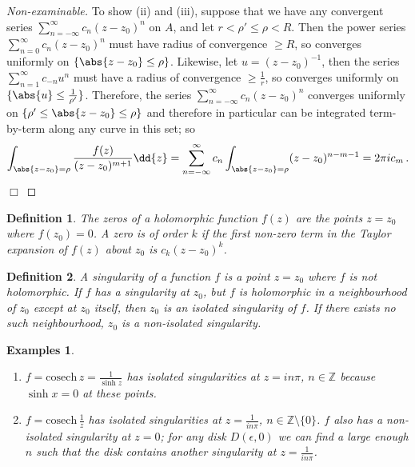 \documentclass{article}
\theoremstyle{plain}\theoremheaderfont{\normalfont\itshape}\theorembodyfont{\rmfamily}\theoremseparator{.}\newtheorem*{rem}{Remark}\newtheorem*{ex}{Example}\newtheorem*{proof}{Proof}\newtheorem*{altp}{Alternative proof}
\theoremstyle{plain}\theoremheaderfont{\normalfont\bfseries}\theorembodyfont{\rmfamily}\theoremseparator{.}\newtheorem{thm}{Theorem}[section]\newtheorem{lem}[thm]{Lemma}\newtheorem{prop}[thm]{Proposition}\newtheorem*{cor}{Corollary}\newtheorem{defn}[thm]{Definition}\newtheorem{clm}[thm]{Claim}\newtheorem{clminproof}{Claim}
\theoremstyle{break}\theoremheaderfont{\normalfont\itshape}\theorembodyfont{\rmfamily}\theoremseparator{.\medskip}\newtheorem*{proofskip}{Proof}\newtheorem*{exs}{Examples}\newtheorem*{rems}{Remarks}
\theoremstyle{break}\theoremheaderfont{\normalfont\bfseries}\theorembodyfont{\rmfamily}\theoremseparator{.\medskip}\newtheorem{lemskip}[thm]{Lemma}\newtheorem{defnskip}[thm]{Definition}\newtheorem{propskip}[thm]{Proposition}\newtheorem{thmskip}[thm]{Theorem}
\numberwithin{equation}{section}
\newcommand{\qed}{\hfill\ensuremath{\Box}}
\begin{document}
\begin{proof}[Non-examinable]
		To show (ii) and (iii), suppose that we have any convergent series \(\sum_{n=-\infty}^{\infty} c_n(z-z_0)^n\) on \(A\),  and let \(r<\rho'\le\rho<R\). Then the power series \(\sum_{n=0}^{\infty}c_n(z-z_0)^n\) must have radius of convergence \(\ge R\), so converges uniformly on \(\{\abs{z-z_0}\le\rho\}\). Likewise, let \(u=(z-z_0)^{-1}\), then the series \(\sum_{n=1}^{\infty}c_{-n}u^n\) must have a radius of convergence \(\ge\frac{1}{r}\), so converges uniformly on \(\{\abs{u}\le\frac{1}{\rho'}\}\). Therefore, the series \(\sum_{n=-\infty}^{\infty} c_n(z-z_0)^n\) converges uniformly on \(\{\rho'\le\abs{z-z_0}\le\rho\}\) and therefore in particular can be integrated term-by-term along any curve in this set; so
		\[\int_{\abs{z-z_0}=\rho}\frac{f(z)}{(z-z_0)^{m+1}}\dd{z}=\sum_{n=-\infty}^{\infty}c_n\int_{\abs{z-z_0}=\rho}(z-z_0)^{n-m-1}=2\pi i c_m\,.\]\qed
	\end{proof}
	\begin{defn}
		The \textit{zeros} of a holomorphic function \(f(z)\) are the points \(z=z_0\) where \(f(z_0)=0\). A zero is of \textit{order} \(k\) if the first non-zero term in the Taylor expansion of \(f(z)\) about \(z_0\) is \(c_k(z-z_0)^k\).
	\end{defn}
	\begin{defn}
		A \textit{singularity} of a function \(f\) is a point \(z=z_0\) where \(f\) is not holomorphic. If \(f\) has a singularity at \(z_0\), but \(f\) is holomorphic in a neighbourhood of \(z_0\) except at \(z_0\) itself, then \(z_0\) is an \textit{isolated singularity} of \(f\). If there exists no such neighbourhood, \(z_0\) is a non-isolated singularity.
	\end{defn}
	\begin{exs}
		\begin{enumerate}[topsep=0pt]
			\item \(f=\mathrm{cosech}\,z=\frac{1}{\sinh z}\) has isolated singularities at \(z=in\pi\), \(n\in\mathbb{Z}\) because \(\sinh x=0\) at these points.
			\item \(f=\mathrm{cosech}\,\frac{1}{z}\) has isolated singularities at \(z=\frac{1}{in\pi}\), \(n\in\mathbb{Z}\setminus\{0\}\). \(f\) also has a non-isolated singularity at \(z=0\); for any disk \(D(\epsilon,0)\) we can find a large enough \(n\) such that the disk contains another singularity at \(z=\frac{1}{in\pi}\).
		\end{enumerate}
	\end{exs}
\end{document}
